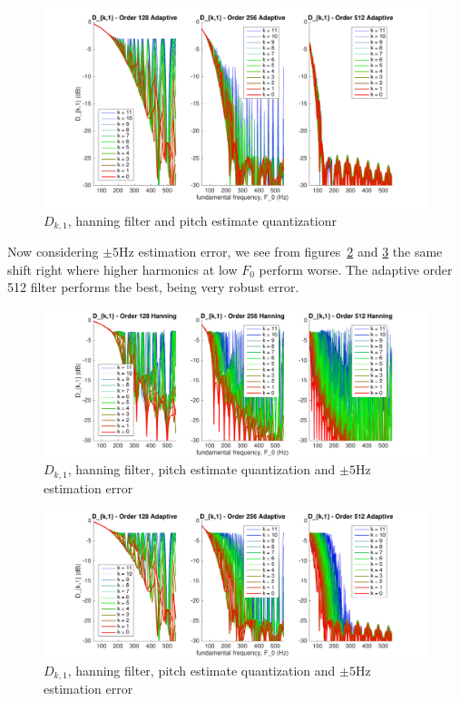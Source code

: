 \documentclass [11pt, proquest,oneside] {ganter_thesis}[2015/03/03]
\begin{document}
\begin{figure}[!ht]
  \centering
    \includegraphics[width=1\textwidth]{pitch_d_ki_2}
    \caption{$D_{k,1}$, hanning filter and pitch estimate quantizationr}\label{fig:pitch_d_ki_2}
\end{figure}

Now considering $\pm5$Hz estimation error, we see from figures~\ref{fig:pitch_d_ki_1_error5} and \ref{fig:pitch_d_ki_2_error5} the same shift right where higher harmonics at low $F_0$ perform worse.  The adaptive order 512 filter performs the best, being very robust error.

\begin{figure}[!ht]
  \centering
    \includegraphics[width=1\textwidth]{pitch_d_ki_1_error5}
    \caption{$D_{k,1}$, hanning filter, pitch estimate quantization and $\pm5$Hz estimation error}\label{fig:pitch_d_ki_1_error5}
\end{figure}

\begin{figure}[!ht]
  \centering
    \includegraphics[width=1\textwidth]{pitch_d_ki_2_error5}
    \caption{$D_{k,1}$, hanning filter, pitch estimate quantization and $\pm5$Hz estimation error}\label{fig:pitch_d_ki_2_error5}
\end{figure}
\end{document}
